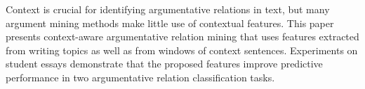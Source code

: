 Context is crucial for identifying argumentative relations in text, but many argument mining methods make little use of contextual features. This paper presents context-aware argumentative relation mining that uses features extracted from writing topics as well as from windows of context sentences. Experiments on student essays demonstrate that the proposed features improve predictive performance in two argumentative relation classification tasks.
